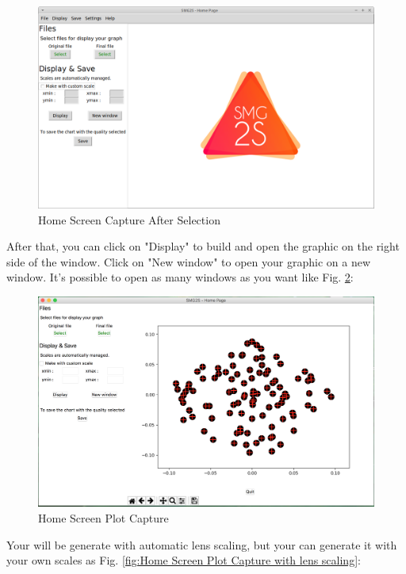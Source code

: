 \documentclass[a4paper, 10 pt]{report}
\begin{document}
\begin{figure}[htbp]
			\label{fig:Home Screen Capture After selection}
	\caption{Home Screen Capture After Selection}
		\centering
	\includegraphics[width=13cm]{home_ready.png}
\end{figure}

After that, you can click on "Display" to build and open the graphic on the right side of the window. Click on "New window" to open your graphic on a new window. It's possible to open as many windows as you want like Fig. \ref{fig:Home Screen Plot Capture}:

\begin{figure}[htbp]
				\label{fig:Home Screen Plot Capture}
	\caption{Home Screen Plot Capture}
		\centering
	\includegraphics[width=12cm]{home_screen.png}
\end{figure}

Your will be generate with automatic lens scaling, but your can generate it with your own scales as Fig. \ref{fig:Home Screen Plot Capture with lens scaling}:
\end{document}
